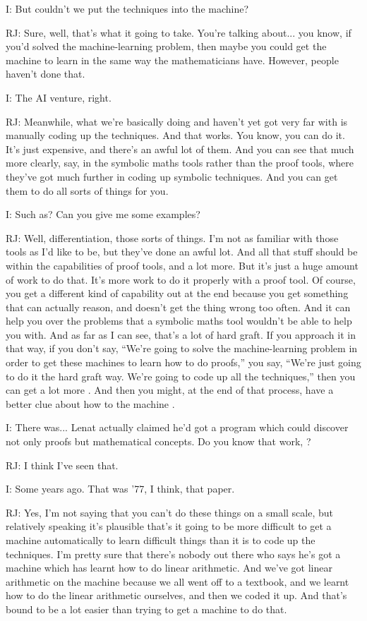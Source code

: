 \documentclass[10pt,titlepage]{book}
\begin{document}
I: But couldn't we put the techniques into the machine?

RJ: Sure, well, that's what it going to take.
You're talking about... you know, if you'd solved the machine-learning problem, then maybe you could get the machine to learn in the same way the mathematicians have. However, people haven't done that.

I: The AI venture, right.

RJ: Meanwhile, what we're basically doing and haven't yet got very far with is manually coding up the techniques.
And that works.
You know, you can do it.
It's just expensive, and there's an awful lot of them.
And you can see that much more clearly, say, in the symbolic maths tools rather than the proof tools, where they've got much further in coding up symbolic techniques.
And you can get them to do all sorts of things for you.

I: Such as?
Can you give me some examples?

RJ: Well, differentiation, those sorts of things.
I'm not as familiar with those tools as I'd like to be, but they've done an awful lot.
And all that stuff should be within the capabilities of proof tools, and a lot more. But it's just a huge amount of work to do that. It's more work to do it properly with a proof tool. Of course, you get a different kind of capability out at the end because you get something that can actually reason, and doesn't get the thing wrong too often. And it can help you over the problems that a symbolic maths tool wouldn't be able to help you with. And as far as I can see, that's a lot of hard graft. If you approach it in that way, if you don't say, ``We're going to solve the machine-learning problem in order to get these machines to learn how to do proofs,'' you say, ``We're just going to do it the hard graft way. We're going to code up all the techniques,'' then you can get a lot more 	. And then you might, at the end of that process, have a better clue about how to 	the machine	.

I: There was... Lenat actually claimed he'd got a program which could discover not only proofs but mathematical concepts.
Do you know that work,	?

RJ: I think I've seen that.

I: Some years ago.
That was '77, I think, that paper.

RJ: Yes, I'm not saying that you can't do these things on a small scale, but relatively speaking it's plausible that's it going to be more difficult to get a machine automatically to learn difficult things than it is to code up the techniques.
I'm pretty sure that there's nobody out there who says he's got a machine which has learnt how to do linear arithmetic.
And we've got linear arithmetic on the machine because we all went off to a textbook, and we learnt how to do the linear arithmetic ourselves, and then we coded it up.
And that's bound to be a lot easier than trying to get a machine to do that.
\end{document}
